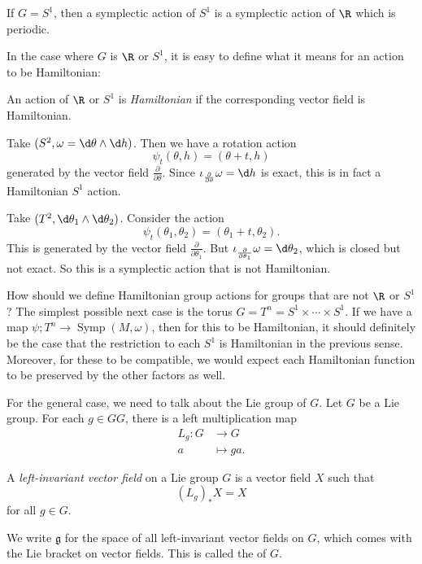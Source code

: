 \documentclass[a4paper]{article}
\DeclareMathOperator{\Symp}{Symp}
\begin{document}
\begin{eg}
  If $G = S^1$, then a symplectic action of $S^1$ is a symplectic action of $\R$ which is periodic.
\end{eg}

In the case where $G$ is $\R$ or $S^1$, it is easy to define what it means for an action to be Hamiltonian:
\begin{defi}
  An action of $\R$ or $S^1$ is \emph{Hamiltonian} if the corresponding vector field is Hamiltonian.
\end{defi}

\begin{eg}
  Take $(S^2, \omega = \d \theta \wedge \d h)$. Then we have a rotation action
  \[
    \psi_t(\theta, h) = (\theta + t, h)
  \]
  generated by the vector field $\frac{\partial}{\partial \theta}$. Since $\iota_{\frac{\partial}{\partial \theta}} \omega = \d h$ is exact, this is in fact a Hamiltonian $S^1$ action.
\end{eg}

\begin{eg}
  Take $(T^2, \d \theta_1 \wedge \d \theta_2)$. Consider the action
  \[
    \psi_t(\theta_1, \theta_2) = (\theta_1 + t, \theta_2).
  \]
  This is generated by the vector field $\frac{\partial}{\partial \theta_1}$. But $\iota_{\frac{\partial}{\partial \theta_1}}\omega = \d \theta_2$, which is closed but not exact. So this is a symplectic action that is not Hamiltonian.
\end{eg}

How should we define Hamiltonian group actions for groups that are not $\R$ or $S^1$? The simplest possible next case is the torus $G = T^n = S^1 \times \cdots \times S^1$. If we have a map $\psi; T^n \to \Symp(M, \omega)$, then for this to be Hamiltonian, it should definitely be the case that the restriction to each $S^1$ is Hamiltonian in the previous sense. Moreover, for these to be compatible, we would expect each Hamiltonian function to be preserved by the other factors as well.

For the general case, we need to talk about the Lie group of $G$. Let $G$ be a Lie group. For each $g \in GG$, there is a left multiplication map
\begin{align*}
  L_g: G &\to G\\
  a &\mapsto ga.
\end{align*}

\begin{defi}
  A \emph{left-invariant vector field} on a Lie group $G$ is a vector field $X$ such that
  \[
    (L_g)_* X = X
  \]
  for all $g \in G$.

  We write $\mathfrak{g}$ for the space of all left-invariant vector fields on $G$, which comes with the Lie bracket on vector fields. This is called the  of $G$.
\end{defi}
\end{document}
